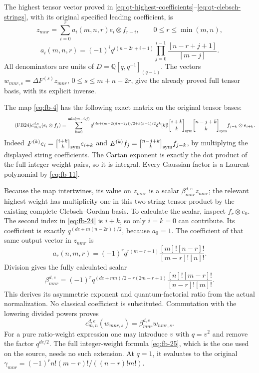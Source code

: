 The highest tensor vector proved in
\eqref{eq:qt-highest-coefficients}--\eqref{eq:qt-clebsch-strings},
with its original specified leading coefficient, is
\[
 z_{mnr}=\sum_{i=0}^r a_i(m,n,r)e_i\otimes f_{r-i},
 \qquad 0\le r\le\min(m,n),
\]
\begin{equation}\tag{FB23}\label{eq:fb-23}
a_i(m,n,r)=(-1)^i q^{i(n-2r+i+1)}
 \prod_{j=0}^{i-1}\frac{[n-r+j+1]}{[m-j]}.
\end{equation}
All denominators are units of
\(D=\mathbb Q[q,q^{-1}]_{(q-1)}\). The vectors
\(w_{mnr,s}=\Delta F^{(s)}z_{mnr}\), \(0\le s\le m+n-2r\), give
the already proved full tensor basis, with its explicit inverse.

The map \eqref{eq:fb-4} has the following exact matrix on the original tensor bases:
\begin{equation}\tag{FB24}\label{eq:fb-24}
c_{m,n}^{d,e}(e_i\otimes f_j)=
 \sum_{k=0}^{\min(m-i,j)}
 q^{(de+(m-2i)(n-2j))/2+k(k-1)/2}\delta^k[k]!
 {i+k\brack k}_{\rm sym}{n-j+k\brack k}_{\rm sym}
 f_{j-k}\otimes e_{i+k}.
\end{equation}
Indeed \(F^{(k)}e_i={i+k\brack k}_{\rm sym}e_{i+k}\) and
\(E^{(k)}f_j={n-j+k\brack k}_{\rm sym}f_{j-k}\), by multiplying
the displayed string coefficients. The Cartan exponent is exactly
the dot product of the full integer weight pairs, so it is integral.
Every Gaussian factor is a Laurent polynomial by \eqref{eq:fb-11}.

Because the map intertwines, its value on \(z_{mnr}\) is a scalar
\(\beta_{mnr}^{d,e}z_{nmr}\); the relevant highest weight has multiplicity
one in this two-string tensor product by the existing complete
Clebsch–Gordan basis. To calculate the scalar, inspect
\(f_r\otimes e_0\). The second index in \eqref{eq:fb-24} is \(i+k\), so only
\(i=k=0\) can contribute. Its coefficient is exactly
\(q^{(de+m(n-2r))/2}\), because \(a_0=1\). The coefficient of that
same output vector in \(z_{nmr}\) is
\[
 a_r(n,m,r)=(-1)^r q^{r(m-r+1)}
 \frac{[m]![n-r]!}{[m-r]![n]!}.
\]
Division gives the fully calculated scalar
\begin{equation}\tag{FB25}\label{eq:fb-25}
\boxed{\displaystyle
 \beta_{mnr}^{d,e}=(-1)^r
 q^{(de+mn)/2-r(2m-r+1)}
 \frac{[n]![m-r]!}{[n-r]![m]!}.}
\end{equation}
This derives its asymmetric exponent and quantum-factorial ratio
from the actual normalization. No classical coefficient is substituted.
Commutation with the lowering divided powers proves
\begin{equation}\tag{FB26}\label{eq:fb-26}
c_{m,n}^{d,e}(w_{mnr,s})=\beta_{mnr}^{d,e}w_{nmr,s}.
\end{equation}
For a pure ratio-weight expression one may introduce \(v\) with
\(q=v^2\) and remove the factor \(q^{de/2}\). The full integer-weight
formula \eqref{eq:fb-25}, which is the one used on the source, needs no such
extension. At \(q=1\), it evaluates to the original
\(\gamma_{mnr}=(-1)^r n!(m-r)!/((n-r)!m!)\).

